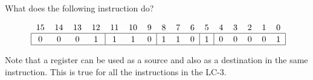 \documentclass{patt}
\begin{document}
\begin{example}
What does the following instruction do?\\
\noindent\hspace*{-9pt}\begin{minipage}{28pc}
\begin{equation*}
\mbox{\renewcommand{\tabcolsep}{6pt}
\begin{tabular}{cccccccccccccccc}
15 & 14 & 13 & 12 & 11 & 10 & 9 & 8 & 7 & 6 & 5 & 4 & 3 & 2 & 1 & 0\\
\hline
\multicolumn{1}{|c}{\rule{0pt}{10pt}0\rule{0pt}{10pt}}&\multicolumn{1}{c}{0}&
\multicolumn{1}{c}{0}&\multicolumn{1}{c}{1}&
\multicolumn{1}{|c}{1}&\multicolumn{1}{ c}{1}&
\multicolumn{1}{c}{0}&\multicolumn{1}{|c}{1}&
\multicolumn{1}{c}{1}&\multicolumn{1}{c}{0}&
\multicolumn{1}{|c}{1}&\multicolumn{1}{|c}{0}&
\multicolumn{1}{c}{0}&\multicolumn{1}{c}{0}&
\multicolumn{1}{c}{0}&\multicolumn{1}{c|}{1}\\
\hline
\end{tabular}}
\end{equation*}
\end{minipage}


Note that a register can be used as a source and also as a destination in
the same instruction. This is true for all the instructions in the LC-3.
\end{example}
\end{document}
